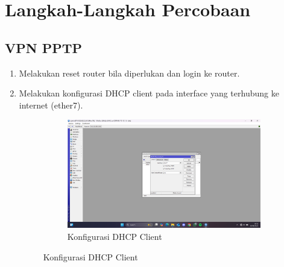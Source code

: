 \section{Langkah-Langkah Percobaan}
\subsection{VPN PPTP}
\begin{enumerate}
	\item Melakukan reset router bila diperlukan dan login ke router.
	\item Melakukan konfigurasi DHCP client pada interface yang terhubung ke internet (ether7).
	\begin{figure}[H]
		\centering
		\begin{subfigure}[b]{0.4\linewidth}
			\includegraphics[width=\linewidth]{P5/img/dhcp client.png}
			\caption{Konfigurasi DHCP Client\label{fig:konfigurasiR1}}
		\end{subfigure}
	\end{figure}
	

\end{enumerate}
